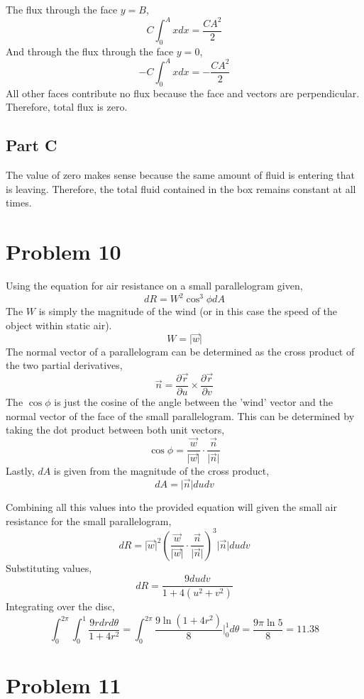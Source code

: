 \documentclass{article}
\begin{document}
The flux through the face $y = B$,
$$ C \int_0^A x dx = \frac{C A^2}{2} $$
And through the flux through the face $y = 0$,
$$ - C\int_0^A x dx = -\frac{C A^2}{2} $$
All other faces contribute no flux because the face and vectors are
perpendicular. Therefore, total flux is zero.

\subsection*{Part C}

The value of zero makes sense because the same amount of fluid is entering that
is leaving. Therefore, the total fluid contained in the box remains constant at
all times.

\section*{Problem 10}

Using the equation for air resistance on a small parallelogram given,
$$ dR = W^2 \cos^3 \phi dA $$
The $W$ is simply the magnitude of the wind (or in this case the speed of the
object within static air).
$$ W = \vert \vec{w} \vert $$
The normal vector of a parallelogram can be determined as the cross product of
the two partial derivatives,
$$ \vec{n} = \frac{\partial \vec{r}}{\partial u} \times \frac{\partial
\vec{r}}{\partial v} $$
The $\cos \phi$ is just the cosine of the angle between the 'wind' vector and
the normal vector of the face of the small parallelogram. This can be determined
by taking the dot product between both unit vectors,
$$ \cos \phi = \frac{\vec{w}}{\vert \vec{w} \vert} \cdot \frac{ \vec{n}
}{\vert\vec{n}\vert} $$
Lastly, $dA$ is given from the magnitude of the cross product,
$$ dA = \vert \vec{n} \vert du dv $$

Combining all this values into the provided equation will given the small air
resistance for the small parallelogram,
$$ dR = \vert \vec{w} \vert^2 \left( \frac{\vec{w}}{\vert \vec{w} \vert} \cdot
\frac{ \vec{n} }{\vert\vec{n}\vert}\right)^3 \vert \vec{n} \vert du dv $$
Substituting values,
$$ dR = \frac{9 du dv}{1 + 4(u^2 + v^2)} $$
Integrating over the disc,
$$ \int_0^{2\pi}\int_0^{1} \frac{9 r dr d\theta}{1 + 4r^2} = \int_0^{2\pi}
\frac{9 \ln (1 + 4r^2)}{8} \bigg\vert_0^1 d\theta = \frac{9 \pi \ln 5}{8} =
11.38 $$

\section*{Problem 11}
\end{document}
